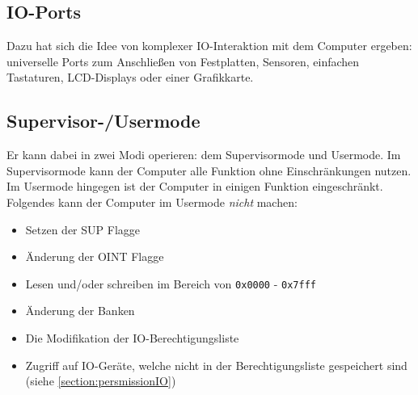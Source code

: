 \documentclass{scrartcl}
\begin{document}
    \subsection{IO-Ports}
    \vspace{-15pt}
    Dazu hat sich die Idee von komplexer IO-Interaktion mit dem Computer ergeben:
    universelle Ports zum Anschließen von Festplatten, Sensoren, einfachen Tastaturen, LCD-Displays oder einer Grafikkarte.

        \vspace{-5pt}

    \subsection{Supervisor-/Usermode}
    \vspace{-15pt}



        Er kann dabei in zwei Modi operieren: dem Supervisormode und Usermode.
        Im Supervisormode kann der Computer alle Funktion ohne Einschränkungen nutzen.
        Im Usermode hingegen ist der Computer in einigen Funktion eingeschränkt.
        Folgendes kann der Computer im Usermode \emph{nicht} machen:

        \begin{itemize}
            \item Setzen der SUP Flagge
            \item Änderung der OINT Flagge
            \item Lesen und/oder schreiben im Bereich von \texttt{0x0000} - \texttt{0x7fff}
            \item Änderung der Banken
            \item Die Modifikation der IO-Berechtigungsliste
            \item Zugriff auf IO-Geräte, welche nicht in der Berechtigungsliste gespeichert sind (siehe \autoref{section:persmissionIO})
        \end{itemize}
\end{document}

